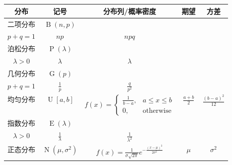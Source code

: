 \documentclass[]{article}
\numberwithin{equation}{section}
\DeclareMathOperator{\E}{E}
\DeclareMathOperator{\N}{N}
\begin{document}
\section{}
\begin{center}
    \begin{tabular}{ccccc}
        \toprule
        分布     & 记号                        & 分布列/概率密度                                                        & 期望            & 方差                 \\
        \midrule
        二项分布 & $\operatorname{B}(n,p)$     & \makecell[c]{$\operatorname{P}(X=k)=C_n^k p^k q^{n-k},$                                                         \\ $p+q=1$}      & $np$            & $npq$ \\
        \midrule
        泊松分布 & $\operatorname{P}(\lambda)$ & \makecell[c]{$\operatorname{P}(X=k)=\frac{\lambda^k}{k!}e^{-\lambda},$                                          \\$\lambda>0$}  & $\lambda$    & $\lambda$       \\
            \midrule
        几何分布 & $\operatorname{G}(p)$       & \makecell[c]{$\operatorname{P}(X=k)=q^{k-1}p,$                                                                  \\$p+q=1$}                             & $\frac{1}{p}$ & $\frac{q}{p^2}$ \\
        \midrule
        均匀分布 & $\operatorname{U}[a,b]$     & $f(x)=\begin{cases}
                \frac{1}{b-a}, & a\le x\le b      \\
                0,             & \text{otherwise}
            \end{cases}  $                                    & $\frac{a+b}{2}$ & $\frac{(b-a)^2}{12}$ \\
        \midrule
        指数分布 & $\E(\lambda)$               & \makecell[c]{$f(x)=\begin{cases}
                    \lambda e^{-\lambda x}, & x>0,   \\
                    0,                      & x\le0,
                \end{cases}  $                                                                \\$\lambda>0$}                     & $\frac{1}{\lambda}$ & $\frac{1}{\lambda^2}$ \\
        \midrule
        正态分布 & $\N(\mu,\sigma^2)$          & $f(x)=\frac{1}{\sigma\sqrt{2\pi}}e^{-\frac{(x-\mu)^2}{2\sigma^2}}$     & $\mu$           & $\sigma^2$           \\
        \bottomrule
    \end{tabular}
\end{center}
\end{document}
